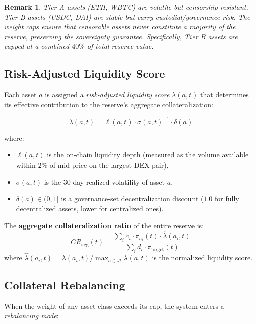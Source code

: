 \documentclass[11pt,a4paper]{article}
\newcommand{\CR}{\mathit{CR}}
\newtheorem{remark}{Remark}
\begin{document}
\begin{remark}
Tier A assets (ETH, WBTC) are volatile but censorship-resistant.
Tier B assets (USDC, DAI) are stable but carry custodial/governance risk.
The weight caps ensure that censorable assets never constitute a majority of the reserve, preserving the sovereignty guarantee.
Specifically, Tier B assets are capped at a combined $40\%$ of total reserve value.
\end{remark}

\subsection{Risk-Adjusted Liquidity Score}

Each asset $a$ is assigned a \emph{risk-adjusted liquidity score} $\lambda(a, t)$ that determines its effective contribution to the reserve's aggregate collateralization:

\begin{equation}
  \lambda(a, t) = \ell(a, t) \cdot \sigma(a, t)^{-1} \cdot \delta(a)
\end{equation}

where:
\begin{itemize}
  \item $\ell(a, t)$ is the on-chain liquidity depth (measured as the volume available within $2\%$ of mid-price on the largest DEX pair),
  \item $\sigma(a, t)$ is the $30$-day realized volatility of asset $a$,
  \item $\delta(a) \in (0, 1]$ is a governance-set decentralization discount ($1.0$ for fully decentralized assets, lower for centralized ones).
\end{itemize}

The \textbf{aggregate collateralization ratio} of the entire reserve is:
\begin{equation}
  \CR_{\text{agg}}(t) = \frac{\sum_{i} c_i \cdot \pi_{a_i}(t) \cdot \hat{\lambda}(a_i, t)}{\sum_{i} d_i \cdot \pi_{\text{target}}(t)}
  \label{eq:cr_agg}
\end{equation}
where $\hat{\lambda}(a_i, t) = \lambda(a_i, t) / \max_{a \in \mathcal{A}} \lambda(a, t)$ is the normalized liquidity score.

\subsection{Collateral Rebalancing}

When the weight of any asset class exceeds its cap, the system enters a \emph{rebalancing mode}:
\end{document}
